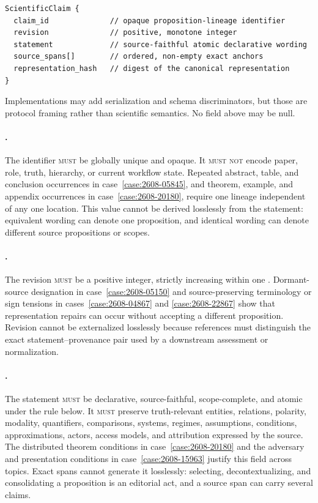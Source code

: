 \begin{lstlisting}[style=interface]
ScientificClaim {
  claim_id              // opaque proposition-lineage identifier
  revision              // positive, monotone integer
  statement             // source-faithful atomic declarative wording
  source_spans[]        // ordered, non-empty exact anchors
  representation_hash   // digest of the canonical representation
}
\end{lstlisting}

Implementations may add serialization and schema discriminators, but those are protocol framing rather than scientific semantics. No field above may be null.

\paragraph{.}
The identifier \textsc{must} be globally unique and opaque. It \textsc{must not} encode paper, role, truth, hierarchy, or current workflow state. Repeated abstract, table, and conclusion occurrences in case~\ref{case:2608-05845}, and theorem, example, and appendix occurrences in case~\ref{case:2608-20180}, require one lineage independent of any one location. This value cannot be derived losslessly from the statement: equivalent wording can denote one proposition, and identical wording can denote different source propositions or scopes.

\paragraph{.}
The revision \textsc{must} be a positive integer, strictly increasing within one . Dormant-source designation in case~\ref{case:2608-05150} and source-preserving terminology or sign tensions in cases~\ref{case:2608-04867} and \ref{case:2608-22867} show that representation repairs can occur without accepting a different proposition. Revision cannot be externalized losslessly because references must distinguish the exact statement--provenance pair used by a downstream assessment or normalization.

\paragraph{.}
The statement \textsc{must} be declarative, source-faithful, scope-complete, and atomic under the rule below. It \textsc{must} preserve truth-relevant entities, relations, polarity, modality, quantifiers, comparisons, systems, regimes, assumptions, conditions, approximations, actors, access models, and attribution expressed by the source. The distributed theorem conditions in case~\ref{case:2608-20180} and the adversary and presentation conditions in case~\ref{case:2608-15963} justify this field across topics. Exact spans cannot generate it losslessly: selecting, decontextualizing, and consolidating a proposition is an editorial act, and a source span can carry several claims.


